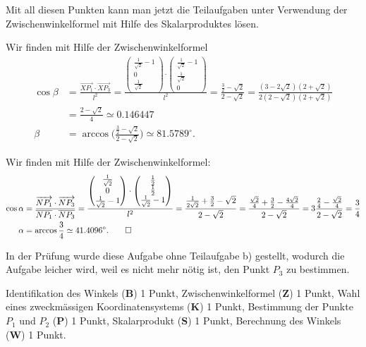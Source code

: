 \begin{loesung}
Mit all diesen Punkten kann man jetzt die Teilaufgaben unter Verwendung
der Zwischenwinkelformel mit Hilfe des Skalarproduktes lösen.
\begin{teilaufgaben}
\item
Wir finden mit Hilfe der Zwischenwinkelformel
\begin{align*}
\cos\beta
&=
\frac{\overrightarrow{XP_1}\cdot\overrightarrow{XP_3}}{l^2}
=
\frac{
\begin{pmatrix}\frac1{\sqrt{2}}-1\\0\\\frac1{\sqrt{2}}\end{pmatrix}
\cdot
\begin{pmatrix}\frac1{\sqrt{2}}-1\\\frac1{\sqrt{2}}\\0\end{pmatrix}
}{l^2}
=
\frac{\frac32-\sqrt{2}}{2-\sqrt{2}}
=
\frac{(3-2\sqrt{2})(2+\sqrt{2})}{2(2-\sqrt{2})(2+\sqrt{2})}
\\
&=
\frac{2-\sqrt{2}}{4}
\simeq
0.146447
\\
\beta
&=
\arccos \biggl(\frac{\frac32-\sqrt{2}}{2-\sqrt{2}}\biggr)
\simeq81.5789^\circ.
\end{align*}
\item
Wir finden mit Hilfe der Zwischenwinkelformel:
\begin{align*}
\cos\alpha
&=
\frac{\overrightarrow{NP_1}\cdot \overrightarrow{NP_3}}{
\overline{NP_1}\cdot\overline{NP_3}
}
=\frac{
\begin{pmatrix}\frac1{\sqrt{2}}\\0\\\frac1{\sqrt{2}}-1\end{pmatrix}
\cdot
\begin{pmatrix}\frac12\\\frac12\\\frac1{\sqrt{2}}-1\end{pmatrix}
}{l^2}
=
\frac{\frac1{2\sqrt{2}}+\frac32-\sqrt{2}}{2-\sqrt{2}}
=
\frac{\frac{\sqrt{2}}{4}+\frac32-\frac{4\sqrt{2}}{4}}{2-\sqrt{2}}
=
3 \frac{\frac24-\frac{\sqrt{2}}4}{2-\sqrt{2}}
=
\frac34
\\
\alpha
&=
\arccos\frac34\simeq41.4096^\circ.
\qedhere
\end{align*}
\end{teilaufgaben}
\end{loesung}

\begin{diskussion}
In der Prüfung wurde diese Aufgabe ohne Teilaufgabe b) gestellt, wodurch
die Aufgabe leicher wird, weil es nicht mehr nötig ist, den Punkt
$P_3$ zu bestimmen.
\end{diskussion}

\begin{bewertung}
Identifikation des Winkels ({\bf B}) 1 Punkt,
Zwischenwinkelformel ({\bf Z}) 1 Punkt,
Wahl eines zweckmässigen Koordinatensystems ({\bf K}) 1 Punkt,
Bestimmung der Punkte $P_1$ und $P_2$ ({\bf P}) 1 Punkt,
Skalarprodukt ({\bf S}) 1 Punkt,
Berechnung des Winkels ({\bf W}) 1 Punkt.
\end{bewertung}


